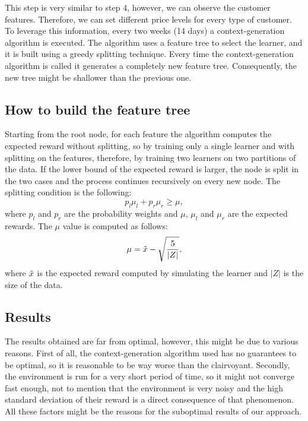 This step is very similar to step 4, however, we can observe the customer features.
Therefore, we can set different price levels for every type of customer.
To leverage this information, every two weeks (14 days) a context-generation algorithm is executed.
The algorithm uses a feature tree to select the learner, and it is built using a greedy splitting technique.
Every time the context-generation algorithm is called it generates a completely new feature tree.
Consequently, the new tree might be shallower than the previous one.

\subsection{How to build the feature tree}
Starting from the root node, for each feature the algorithm computes the expected reward without splitting, so by training only a single learner and with splitting on the features, therefore, by training two learners on two partitions of the data.
If the lower bound of the expected reward is larger, the node is split in the two cases and the process continues recursively on every new node.
The splitting condition is the following:
\begin{equation}
    p_l\mu_l + p_r \mu_r \geq \mu,
\end{equation}
where $p_l$ and $p_r$ are the probability weights and $\mu$, $\mu_l$ and $\mu_r$ are the expected rewards.
The $\mu$ value is computed as follows:
\begin{equation}
    \mu = \Tilde{x} - \sqrt{\frac{5}{|Z|}},
\end{equation}
where $\Tilde{x}$ is the expected reward computed by simulating the learner and $|Z|$ is the size of the data.


\subsection{Results}
The results obtained are far from optimal, however, this might be due to various reasons.
First of all, the context-generation algorithm used has no guarantees to be optimal, so it is reasonable to be way worse than the clairvoyant.
Secondly, the environment is run for a very short period of time, so it might not converge fast enough, not to mention that the environment is very noisy and the high standard deviation of their reward is a direct consequence of that phenomenon.
All these factors might be the reasons for the suboptimal results of our approach.

